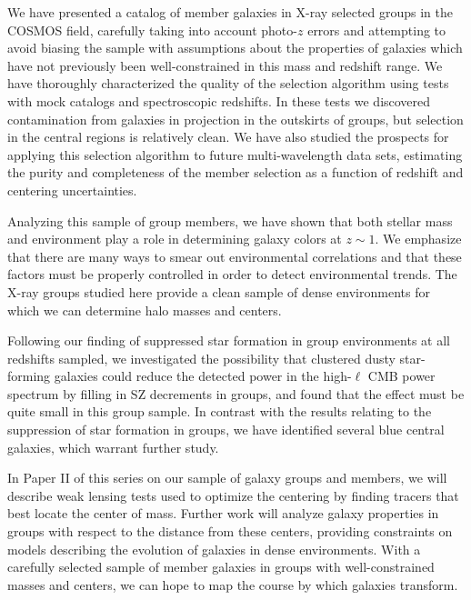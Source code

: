 We have presented a catalog of member galaxies in X-ray selected
groups in the COSMOS field, carefully taking into account photo-$z$
errors and attempting to avoid biasing the sample with assumptions
about the properties of galaxies which have not previously been
well-constrained in this mass and redshift range. We have thoroughly
characterized the quality of the selection algorithm using tests with
mock catalogs and spectroscopic redshifts. In these tests we
discovered contamination from galaxies in projection in the outskirts
of groups, but selection in the central regions is relatively clean. 
We have also studied the prospects for applying this selection
algorithm to future multi-wavelength data sets, estimating the purity
and completeness of the member selection as a function of redshift and
centering uncertainties.

Analyzing this sample of group members, we have shown that both
stellar mass and environment play a role in determining galaxy colors
at $z\sim 1$. We emphasize that there are many ways to smear out
environmental correlations and that these factors must be properly
controlled in order to detect environmental trends. The X-ray
groups studied here provide a clean sample of dense environments for
which we can determine halo masses and centers.

Following our finding of suppressed star formation in group
environments at all redshifts sampled, we investigated the possibility
that clustered dusty star-forming galaxies could reduce the detected power in the
high-$\ell$ CMB power spectrum by filling in SZ decrements in
groups, and found that the effect must be quite small in this group
sample. In contrast with the results relating to the suppression of
star formation in groups, we have identified several blue
central galaxies, which warrant further study.

In Paper II of this series on our sample of galaxy groups and members, we
will describe weak lensing tests used to optimize the centering by
finding tracers that best locate the center of mass. Further work
will analyze galaxy properties in groups with respect to the distance
from these centers, providing constraints on models describing the
evolution of galaxies in dense environments. With a
carefully selected sample of member galaxies in groups with
well-constrained masses and centers, we can hope to map the course by
which galaxies transform.

